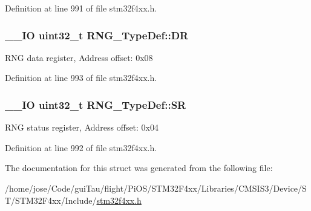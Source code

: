 Definition at line 991 of file stm32f4xx.\-h.

\hypertarget{struct_r_n_g___type_def_a89f3352fb11cca430aaecc0c9b49c6d3}{
\subsubsection[{D\-R}]{\setlength{\rightskip}{0pt plus 5cm}\-\_\-\-\_\-\-I\-O {\bf uint32\-\_\-t} R\-N\-G\-\_\-\-Type\-Def\-::\-D\-R}}\label{struct_r_n_g___type_def_a89f3352fb11cca430aaecc0c9b49c6d3}
R\-N\-G data register, Address offset\-: 0x08 

Definition at line 993 of file stm32f4xx.\-h.

\hypertarget{struct_r_n_g___type_def_a4e4c38cd6a078fea5f9fa5e31bc0d326}{
\subsubsection[{S\-R}]{\setlength{\rightskip}{0pt plus 5cm}\-\_\-\-\_\-\-I\-O {\bf uint32\-\_\-t} R\-N\-G\-\_\-\-Type\-Def\-::\-S\-R}}\label{struct_r_n_g___type_def_a4e4c38cd6a078fea5f9fa5e31bc0d326}
R\-N\-G status register, Address offset\-: 0x04 

Definition at line 992 of file stm32f4xx.\-h.



The documentation for this struct was generated from the following file\-:\begin{DoxyCompactItemize}
\item 
/home/jose/\-Code/gui\-Tau/flight/\-Pi\-O\-S/\-S\-T\-M32\-F4xx/\-Libraries/\-C\-M\-S\-I\-S3/\-Device/\-S\-T/\-S\-T\-M32\-F4xx/\-Include/\hyperlink{stm32f4xx_8h}{stm32f4xx.\-h}\end{DoxyCompactItemize}
